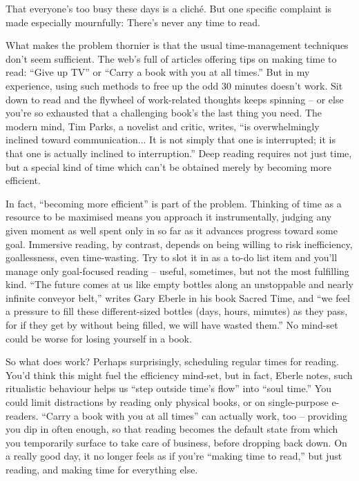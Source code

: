 That everyone's too busy these days is a cliché. But one specific complaint is made especially mournfully: There's never any time to read.


What makes the problem thornier is that the usual time-management techniques don't seem sufficient. The web's full of articles offering tips on making time to read: ``Give up TV'' or ``Carry a book with you at all times.'' But in my experience, using such methods to free up the odd 30 minutes doesn't work. Sit down to read and the flywheel of work-related thoughts keeps spinning – or else you're so exhausted that a challenging book's the last thing you need. The modern mind, Tim Parks, a novelist and critic, writes, ``is overwhelmingly inclined toward communication... It is not simply that one is interrupted; it is that one is actually inclined to interruption.'' Deep reading requires not just time, but a special kind of time which can't be obtained merely by becoming more efficient.


In fact, ``becoming more efficient'' is part of the problem. Thinking of time as a resource to be maximised means you approach it instrumentally, judging any given moment as well spent only in so far as it advances progress toward some goal. Immersive reading, by contrast, depends on being willing to risk inefficiency, goallessness, even time-wasting. Try to slot it in as a to-do list item and you'll manage only goal-focused reading – useful, sometimes, but not the most fulfilling kind. ``The future comes at us like empty bottles along an unstoppable and nearly infinite conveyor belt,'' writes Gary Eberle in his book Sacred Time, and ``we feel a pressure to fill these different-sized bottles (days, hours, minutes) as they pass, for if they get by without being filled, we will have wasted them.'' No mind-set could be worse for losing yourself in a book.


So what does work? Perhaps surprisingly, scheduling regular times for reading. You'd think this might fuel the efficiency mind-set, but in fact, Eberle notes, such ritualistic behaviour helps us ``step outside time's flow'' into ``soul time.'' You could limit distractions by reading only physical books, or on single-purpose e-readers. ``Carry a book with you at all times'' can actually work, too – providing you dip in often enough, so that reading becomes the default state from which you temporarily surface to take care of business, before dropping back down. On a really good day, it no longer feels as if you're ``making time to read,'' but just reading, and making time for everything else.


